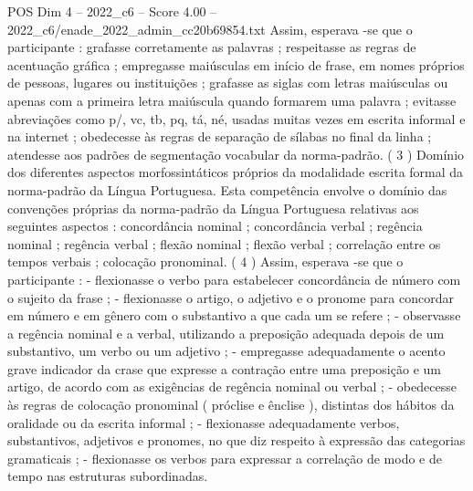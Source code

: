 \begin{textsample}{POS Dim 4 – 2022\_c6 – Score 4.00 – 2022\_c6/enade\_2022\_admin\_cc20b69854.txt}
Assim, esperava -se que o participante : grafasse corretamente as palavras ; respeitasse as regras de acentuação gráfica ; empregasse maiúsculas em início de frase, em nomes próprios de pessoas, lugares ou instituições ; grafasse as siglas com letras maiúsculas ou apenas com a primeira letra maiúscula quando formarem uma palavra ; evitasse abreviações como p/, vc, tb, pq, tá, né, usadas muitas vezes em escrita informal e na internet ; obedecesse às regras de separação de sílabas no final da linha ; atendesse aos padrões de segmentação vocabular da norma-padrão. ( 3 ) Domínio dos diferentes aspectos morfossintáticos próprios da modalidade escrita formal da norma-padrão da Língua Portuguesa.
Esta competência envolve o domínio das convenções próprias da norma-padrão da Língua Portuguesa relativas aos seguintes aspectos : concordância nominal ; concordância verbal ; regência nominal ; regência verbal ; flexão nominal ; flexão verbal ; correlação entre os tempos verbais ; colocação pronominal. ( 4 ) Assim, esperava -se que o participante : - flexionasse o verbo para estabelecer concordância de número com o sujeito da frase ; - flexionasse o artigo, o adjetivo e o pronome para concordar em número e em gênero com o substantivo a que cada um se refere ; - observasse a regência nominal e a verbal, utilizando a preposição adequada depois de um substantivo, um verbo ou um adjetivo ; - empregasse adequadamente o acento grave indicador da crase que expresse a contração entre uma preposição e um artigo, de acordo com as exigências de regência nominal ou verbal ; - obedecesse às regras de colocação pronominal ( próclise e ênclise ), distintas dos hábitos da oralidade ou da escrita informal ; - flexionasse adequadamente verbos, substantivos, adjetivos e pronomes, no que diz respeito à expressão das categorias gramaticais ; - flexionasse os verbos para expressar a correlação de modo e de tempo nas estruturas subordinadas.

\end{textsample}
